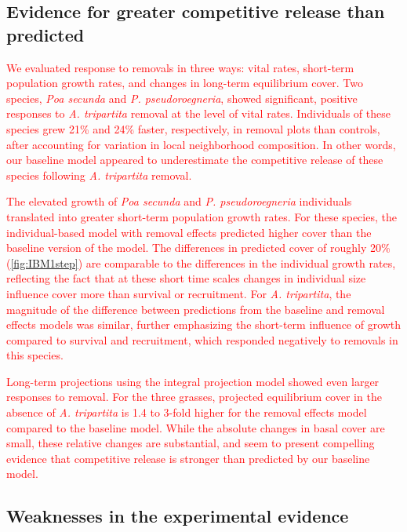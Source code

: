 \documentclass[11pt]{article}
\newcommand{\new}{\textcolor{red}}
\begin{document}
\begin{doublespacing}
\subsection*{Evidence for greater competitive release than predicted}

\new{We evaluated response to removals in three ways: vital rates, short-term population growth rates, and changes in long-term equilibrium cover. Two species, \textit{Poa secunda} and \textit{P. pseudoroegneria}, showed significant, positive responses to \textit{A. tripartita} removal at the level of vital rates. Individuals of these species grew 21\% and 24\% faster, respectively, in removal plots than controls, after accounting for variation in local neighborhood composition. In other words, our baseline model appeared to underestimate the competitive release of these species following \textit{A. tripartita} removal.}

\new{The elevated growth of \textit{Poa secunda} and \textit{P. pseudoroegneria} individuals translated into greater short-term population growth rates. For these species, the individual-based model with removal effects predicted higher cover than the baseline version of the model. The differences in predicted cover of roughly 20\% (\ref{fig:IBM1step}) are comparable to the differences in the individual growth rates, reflecting the fact that at these short time scales changes in individual size influence cover more than survival or recruitment.  For \textit{A. tripartita}, the magnitude of the difference between predictions from the baseline and removal effects models was similar, further emphasizing the short-term influence of growth compared to survival and recruitment, which responded negatively to removals in this species.   }

\new{Long-term projections using the integral projection model showed even larger responses to removal. For the three grasses, projected equilibrium cover in the absence of \textit{A. tripartita} is 1.4 to 3-fold higher for the removal effects model compared to the baseline model. While the absolute changes in basal cover are small, these relative changes are substantial, and seem to present compelling evidence that competitive release is stronger than predicted by our baseline model.  }

\subsection*{Weaknesses in the experimental evidence}


\end{doublespacing}
\end{document}
